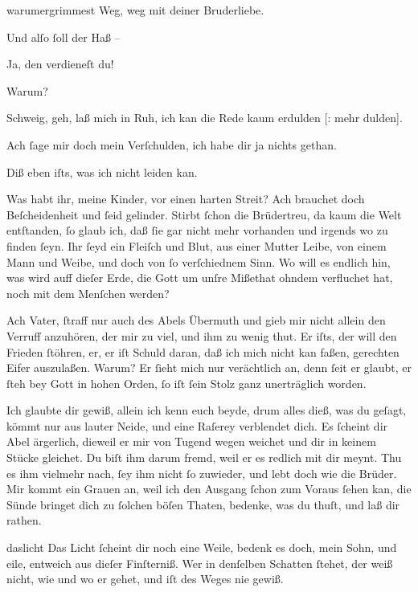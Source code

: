 \documentclass[tocstyle=ref-genre]{ees}
\begin{document}
{\begin{movement}{warumergrimmest}
  \voice[Cain]
  Weg, weg mit deiner Bruderliebe.

  \voice[Abel]
  Und alſo ſoll der Haß –

  \voice[Cain]
  Ja, den verdieneſt du!

  \voice[Abel]
  Warum?

  \voice[Cain]
  Schweig, geh, laß mich in Ruh,
  ich kan die Rede kaum erdulden [: mehr dulden].

  \voice[Abel]
  Ach ſage mir doch mein Verſchulden,
  ich habe dir ja nichts gethan.

  \voice[Cain]
  Diß eben iſts, was ich nicht leiden kan.

  \voice[Adam]
  Was habt ihr, meine Kinder,
  vor einen harten Streit?
  Ach brauchet doch Beſcheidenheit
  und ſeid gelinder.
  Stirbt ſchon die Brüdertreu,
  da kaum die Welt entſtanden,
  ſo glaub ich, daß ſie gar nicht mehr vorhanden
  und irgends wo zu finden ſeyn.
  Ihr ſeyd ein Fleiſch und Blut, aus einer Mutter Leibe,
  von einem Mann und Weibe,
  und doch von ſo verſchiednem Sinn.
  Wo will es endlich hin,
  was wird auff dieſer Erde,
  die Gott um unſre Mißethat
  ohndem verfluchet hat,
  noch mit dem Menſchen werden?

  \voice[Cain]
  Ach Vater, ſtraff nur auch des Abels Übermuth
  und gieb mir nicht allein den Verruff anzuhören,
  der mir zu viel, und ihm zu wenig thut.
  Er iſts, der will den Frieden ſtöhren,
  er, er iſt Schuld daran,
  daß ich mich nicht kan faßen,
  gerechten Eifer auszulaßen.
  Warum? Er ſieht mich nur verächtlich an,
  denn ſeit er glaubt, er ſteh bey Gott in hohen Orden,
  ſo iſt ſein Stolz ganz unerträglich worden.

  \voice[Adam]
  Ich glaubte dir gewiß,
  allein ich kenn euch beyde,
  drum alles dieß, was du geſagt,
  kömmt nur aus lauter Neide,
  und eine Raſerey verblendet dich.
  Es ſcheint dir Abel ärgerlich,
  dieweil er mir von Tugend wegen weichet
  und dir in keinem Stücke gleichet.
  Du biſt ihm darum fremd,
  weil er es redlich mit dir meynt.
  Thu es ihm vielmehr nach, ſey ihm nicht ſo zuwieder,
  und lebt doch wie die Brüder.
  Mir kommt ein Grauen an,
  weil ich den Ausgang ſchon zum Voraus ſehen kan,
  die Sünde bringet dich zu ſolchen böſen Thaten,
  bedenke, was du thuſt, und laß dir rathen.
\end{movement}

\begin{movement}{daslicht}
  \voice[Adam]
  Das Licht ſcheint dir noch eine Weile,
  bedenk es doch, mein Sohn, und eile,
  entweich aus dieſer Finſterniß.
  Wer in denſelben Schatten ſtehet,
  der weiß nicht, wie und wo er gehet,
  und iſt des Weges nie gewiß.
\end{movement}

}
\end{document}
